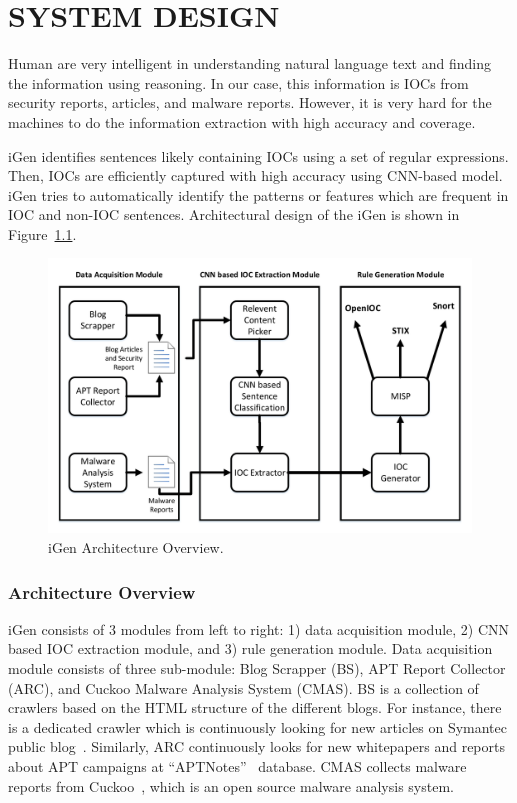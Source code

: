 \chapter{SYSTEM DESIGN}
\label{igen}
Human are very intelligent in understanding natural language text and finding the information using reasoning. In our case, this information is IOCs from security reports, articles, and malware reports. However, it is very hard for the machines to do the information extraction with high accuracy and coverage. 

iGen identifies sentences likely containing IOCs using a set of regular expressions. Then, IOCs are efficiently captured with high accuracy using CNN-based model.  iGen tries to automatically identify the patterns or features which are frequent in IOC and non-IOC sentences. Architectural design of the iGen is shown in Figure~\ref{fig:architecture}.


\begin{figure}[tb]
\centering
\includegraphics [width=\linewidth]{Architecture.pdf}
\caption{iGen Architecture Overview.}
\label{fig:architecture}
\end{figure}


\subsection{Architecture Overview}
iGen consists of 3 modules from left to right: 1) data acquisition module, 2) CNN based IOC extraction module, and 3) rule generation module. Data acquisition module consists of three sub-module: Blog Scrapper (BS), APT Report Collector (ARC), and Cuckoo Malware Analysis System (CMAS). BS is a collection of crawlers based on the HTML structure of the different blogs. For instance, there is a dedicated crawler which is continuously looking for new articles on Symantec public blog~\cite{symantecblog}. Similarly, ARC continuously looks for new whitepapers and reports about APT campaigns at ``APTNotes''~\cite{apt} database. CMAS collects malware reports from Cuckoo~\cite{bayer}, which is an open source malware analysis system. 

